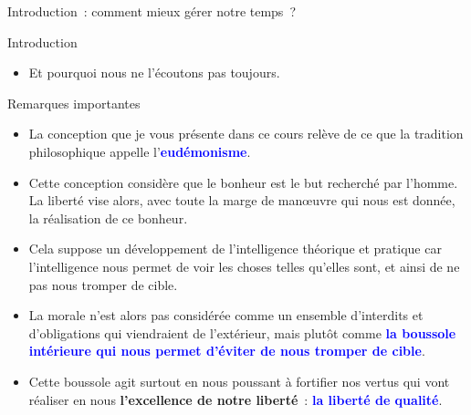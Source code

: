 \documentclass[11pt,xcolor=dvipsname,ignorenonframetext,handout]{beamer}
\begin{document}
\begin{frame}{Introduction~: comment mieux gérer notre temps~?}
\begin{frame}{Introduction}
\begin{itemize}
        \item Et pourquoi nous ne l'écoutons pas toujours.
    \end{itemize}
\end{frame}
\begin{frame}{Remarques importantes}
    \begin{itemize}
    \rightskip=0pt\leftskip=0pt    
    \item La conception que je vous présente dans ce cours relève de ce que la tradition philosophique appelle l'\textcolor{blue}{\textbf{eudémonisme}}.
    \item Cette conception considère que le bonheur est le but recherché par l'homme. La liberté vise alors, avec toute la marge de manœuvre qui nous est donnée, la réalisation de ce bonheur. 
    \item Cela suppose un développement de l'intelligence théorique et pratique car l'intelligence nous permet de voir les choses telles qu'elles sont, et ainsi de ne pas nous tromper de cible. 
    \item La morale n'est alors pas considérée comme un ensemble d'interdits et d'obligations qui viendraient de l'extérieur, mais plutôt comme \textcolor{blue}{\textbf{la boussole intérieure qui nous permet d'éviter de nous tromper de cible}}.
    \item Cette boussole agit surtout en nous poussant à fortifier nos vertus qui vont réaliser en nous \textbf{l'excellence de notre liberté}~: \textcolor{blue}{\textbf{la liberté de qualité}}.
    \end{itemize}
\end{frame}

\end{frame}
\end{document}
